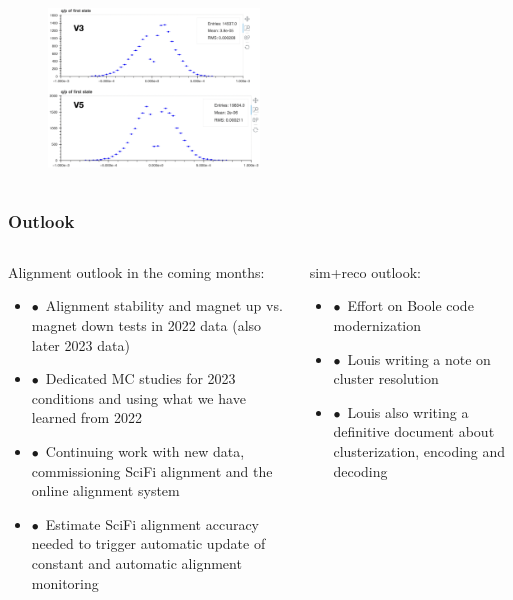 \documentclass[aspectratio=1610, 12pt, xcolor=dvipsnames]{beamer}
\begin{document}
\begin{frame}
\begin{columns}
\begin{column}[c]{0.49\textwidth}
\begin{figure}
        \includegraphics[width=0.5\textwidth]{plots/qop_v3v5.png}
      \end{figure}
    \end{column}
  \end{columns}  
\end{frame}

\begin{frame}\frametitle{Outlook}
  \begin{columns}
    \begin{column}[c]{0.55\textwidth}
      Alignment outlook in the coming months:
      \begin{itemize}
        \item $\bullet$\, Alignment stability and magnet up vs. magnet down tests in 2022 data (also later 2023 data)
        \item $\bullet$\, Dedicated MC studies for 2023 conditions and using what we have learned from 2022
        \item $\bullet$\, Continuing work with new data, commissioning SciFi alignment and the online alignment system
        \item $\bullet$\, Estimate SciFi alignment accuracy needed to trigger automatic update of constant and automatic alignment monitoring
      \end{itemize}
    \end{column}
    \begin{column}[c]{0.43\textwidth}
      sim+reco outlook:
      \begin{itemize}
      	\item $\bullet$\, Effort on Boole code modernization
	      \item $\bullet$\, Louis writing a note on cluster resolution
	      \item $\bullet$\, Louis also writing a definitive document about clusterization, encoding and decoding
      \end{itemize}
    \end{column}
  \end{columns}
\end{frame}
\end{document}
